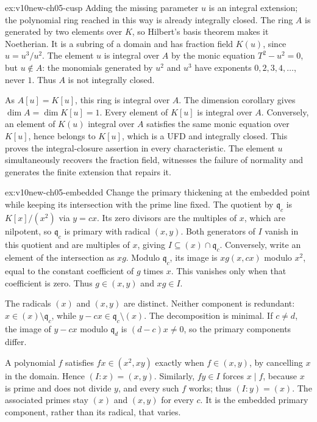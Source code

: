 \begin{solution}{ex:v10new-ch05-cusp}
\idea Adding the missing parameter $u$ is an integral extension; the polynomial ring reached in this way is already integrally closed.
\writeup The ring $A$ is generated by two elements over $K$, so Hilbert's basis theorem makes it Noetherian. It is a subring of a domain and has fraction field $K(u)$, since $u=u^3/u^2$. The element $u$ is integral over $A$ by the monic equation $T^2-u^2=0$, but $u\notin A$: the monomials generated by $u^2$ and $u^3$ have exponents $0,2,3,4,\ldots$, never $1$. Thus $A$ is not integrally closed.

As $A[u]=K[u]$, this ring is integral over $A$. The dimension corollary gives $\dim A=\dim K[u]=1$. Every element of $K[u]$ is integral over $A$. Conversely, an element of $K(u)$ integral over $A$ satisfies the same monic equation over $K[u]$, hence belongs to $K[u]$, which is a UFD and integrally closed. This proves the integral-closure assertion in every characteristic. The element $u$ simultaneously recovers the fraction field, witnesses the failure of normality and generates the finite extension that repairs it.
\end{solution}

\begin{solution}{ex:v10new-ch05-embedded}
\idea Change the primary thickening at the embedded point while keeping its intersection with the prime line fixed.
\writeup The quotient by $\mathfrak q_c$ is $K[x]/(x^2)$ via $y=cx$. Its zero divisors are the multiples of $x$, which are nilpotent, so $\mathfrak q_c$ is primary with radical $(x,y)$. Both generators of $I$ vanish in this quotient and are multiples of $x$, giving $I\subseteq(x)\cap\mathfrak q_c$. Conversely, write an element of the intersection as $xg$. Modulo $\mathfrak q_c$, its image is $xg(x,cx)$ modulo $x^2$, equal to the constant coefficient of $g$ times $x$. This vanishes only when that coefficient is zero. Thus $g\in(x,y)$ and $xg\in I$.

The radicals $(x)$ and $(x,y)$ are distinct. Neither component is redundant: $x\in(x)\setminus\mathfrak q_c$, while $y-cx\in\mathfrak q_c\setminus(x)$. The decomposition is minimal. If $c\ne d$, the image of $y-cx$ modulo $\mathfrak q_d$ is $(d-c)x\ne0$, so the primary components differ.

A polynomial $f$ satisfies $fx\in(x^2,xy)$ exactly when $f\in(x,y)$, by cancelling $x$ in the domain. Hence $(I:x)=(x,y)$. Similarly, $fy\in I$ forces $x\mid f$, because $x$ is prime and does not divide $y$, and every such $f$ works; thus $(I:y)=(x)$. The associated primes stay $(x)$ and $(x,y)$ for every $c$. It is the embedded primary component, rather than its radical, that varies.
\end{solution}

